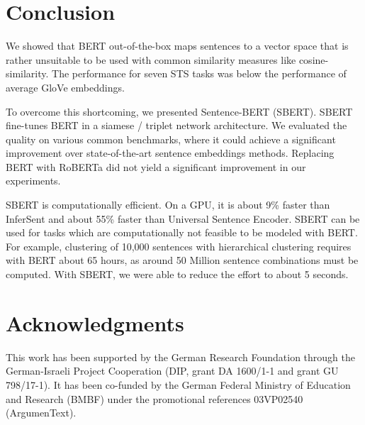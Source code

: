 \documentclass[11pt,a4paper]{article}
\begin{document}
\section{Conclusion}
We showed that BERT out-of-the-box maps sentences to a vector space that is rather unsuitable to be used with common similarity measures like cosine-similarity. The performance for seven STS tasks was below the performance of average GloVe embeddings. 

To overcome this shortcoming, we presented Sentence-BERT (SBERT). SBERT fine-tunes BERT in a siamese / triplet network architecture. We evaluated the quality on various common benchmarks, where it could achieve a significant improvement over state-of-the-art sentence embeddings methods. Replacing BERT with RoBERTa did not yield a significant improvement in our experiments.


SBERT is computationally efficient. On a GPU, it is about 9\% faster than InferSent and about 55\% faster than Universal Sentence Encoder. SBERT can be used for tasks which are computationally not feasible to be modeled with BERT. For example, clustering of 10,000 sentences with hierarchical clustering requires with BERT about 65 hours, as around 50 Million sentence combinations must be computed. With SBERT, we were able to reduce the effort to about 5 seconds.  




\section*{Acknowledgments}
This work has been supported by the German Research Foundation through the German-Israeli Project Cooperation (DIP, grant DA 1600/1-1 and grant GU 798/17-1). It has been co-funded by the German Federal Ministry of Education and Research (BMBF) under the promotional references 03VP02540 (ArgumenText).



\end{document}
